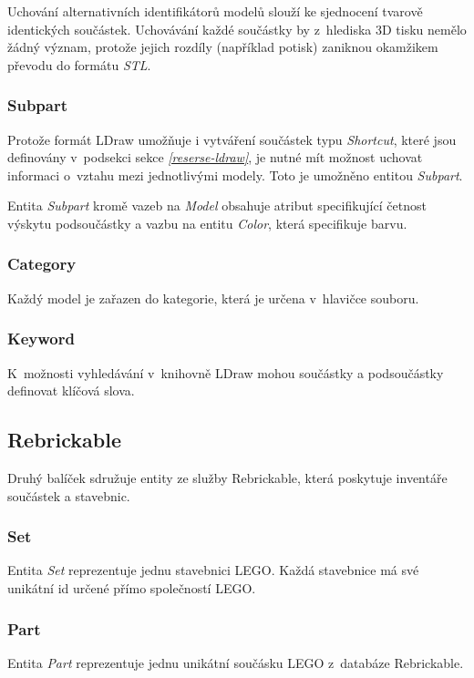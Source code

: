 Uchování alternativních identifikátorů modelů slouží ke sjednocení tvarově identických součástek. Uchovávání každé součástky by z~hlediska 3D tisku nemělo žádný význam, protože jejich rozdíly (například potisk) zaniknou okamžikem převodu do formátu \textit{STL}.

\subsubsection*{Subpart}
Protože formát LDraw umožňuje i vytváření součástek typu \textit{Shortcut}, které jsou definovány v~podsekci \emph{} sekce \emph{\ref{reserse-ldraw}}, je nutné mít možnost uchovat informaci o~vztahu mezi jednotlivými modely. Toto je umožněno entitou \textit{Subpart}. 

Entita \textit{Subpart} kromě vazeb na \textit{Model} obsahuje atribut specifikující četnost výskytu podsoučástky a vazbu na entitu \textit{Color}, která specifikuje barvu. 

\subsubsection*{Category}
Každý model je zařazen do kategorie, která je určena v~hlavičce souboru.

\subsubsection*{Keyword}
K~možnosti vyhledávání v~knihovně LDraw mohou součástky a podsoučástky definovat klíčová slova.

\subsection{Rebrickable}
Druhý balíček sdružuje entity ze služby Rebrickable, která poskytuje inventáře součástek a stavebnic.

\subsubsection*{Set}
Entita \textit{Set} reprezentuje jednu stavebnici LEGO. Každá stavebnice má své unikátní id určené přímo společností LEGO. 

\subsubsection*{Part}
Entita \textit{Part} reprezentuje jednu unikátní součásku LEGO z~databáze Rebrickable.

